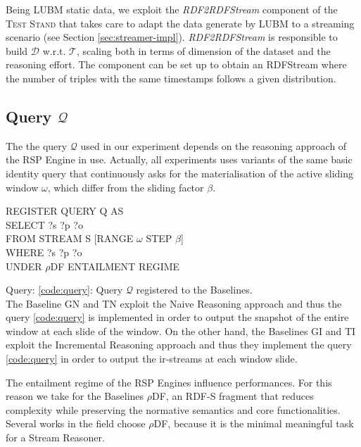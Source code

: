 Being LUBM static data, we exploit the \textit{RDF2RDFStream} component of the \textsc{Test Stand} that takes care to adapt the data generate by LUBM to a streaming scenario (see Section \ref{sec:streamer-impl}). \textit{RDF2RDFStream} is responsible to build $\mathcal{D}$ w.r.t. $\mathcal{T}$, scaling both in terms of dimension of the dataset and the reasoning effort. The component can be set up to obtain an RDFStream where the number of triples with the same timestamps follows a given distribution. %

\subsection{Query $\mathcal{Q}$}\label{sec:query}
 
The the query $\mathcal{Q}$ used in our experiment depends on the reasoning approach of the RSP Engine in use. Actually, all  experiments uses variants of the same basic identity query that continuously asks for the materialisation of the active sliding window $\omega$, which differ from the sliding factor $\beta$.\\

\begin{center}
\raggedright
REGISTER QUERY Q AS \\
SELECT ?s ?p ?o \\
FROM STREAM S [RANGE $\omega$ STEP $\beta$]\\
WHERE {?s ?p ?o}\\
UNDER $\rho$DF ENTAILMENT REGIME
\label{code:query}

\end{center}
Query: \ref{code:query}: Query $\mathcal{Q}$ registered to the \name Baselines.\\


The Baseline GN and TN exploit the Naive Reasoning approach and thus the query \ref{code:query} is implemented in order to output the snapshot of the entire window at each slide of the window. On the other hand, the Baselines GI and TI exploit the Incremental Reasoning approach and thus they implement the query \ref{code:query} in order to output the ir-streams at each window slide.

The entailment regime of the RSP Engines influence performances. For this reason we take for the Baselines $\rho$DF, an RDF-S fragment that reduces complexity while preserving the normative semantics and core functionalities. \cite{DBLP:conf/esws/MunozPG07}  Several works in the field \cite{DBLP:conf/semweb/UrbaniMJHB13, Liu:2014:ERS:2567948.2577323} choose $\rho$DF, because it is the minimal meaningful task for a Stream Reasoner.

